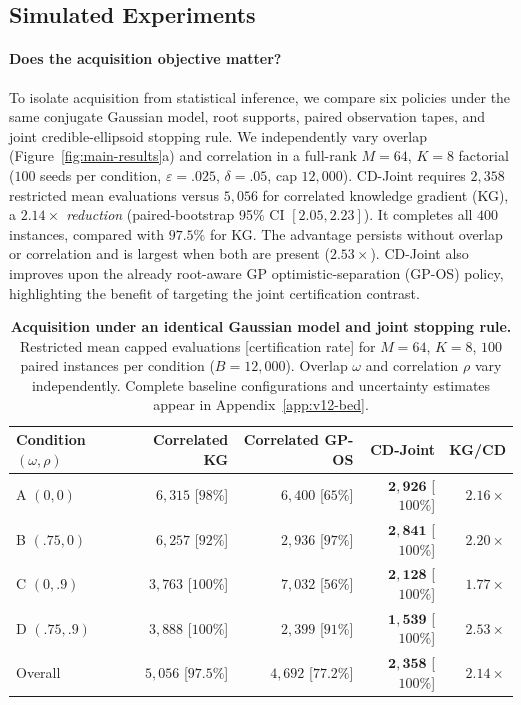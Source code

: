 \documentclass{article}
\theoremstyle{plain}
\theoremstyle{definition}
\begin{document}
\subsection{Simulated Experiments}

\paragraph{Does the acquisition objective matter?}
\label{sec:exp-bed-vs-bo}
To isolate acquisition from statistical inference, we compare six
policies under the same conjugate Gaussian model, root supports,
paired observation tapes, and joint credible-ellipsoid stopping rule.
We independently vary overlap (Figure~\ref{fig:main-results}a) and correlation in a full-rank
$M=64$, $K=8$ factorial ($100$ seeds per condition,
$\varepsilon=.025$, $\delta=.05$, cap $12{,}000$).
CD-Joint requires $2{,}358$ restricted mean evaluations versus
$5{,}056$ for correlated knowledge gradient (KG), a
\emph{$2.14\times$ reduction} (paired-bootstrap 95\% CI $[2.05,2.23]$).
It completes all $400$ instances, compared with $97.5\%$ for KG.
The advantage persists without overlap or correlation and is largest
when both are present ($2.53\times$). CD-Joint also improves upon
the already root-aware GP optimistic-separation (GP-OS) policy,
highlighting the benefit of targeting the joint certification contrast.

\begin{table}[H]
\centering\small
\caption{\textbf{Acquisition under an identical Gaussian model
and joint stopping rule.} Restricted mean capped evaluations
[certification rate] for $M=64$, $K=8$, $100$ paired instances
per condition ($B=12{,}000$). Overlap $\omega$ and correlation
$\rho$ vary independently. Complete baseline configurations and
uncertainty estimates appear in Appendix~\ref{app:v12-bed}.}
\label{tab:main-bed-vs-bo}
\setlength{\tabcolsep}{5pt}
\begin{tabular}{@{}lrrrr@{}}
\toprule
Condition $(\omega,\rho)$ & Correlated KG & Correlated GP-OS & CD-Joint & KG/CD \\
\midrule
A $(0,0)$ & $6{,}315$ [$98\%$] & $6{,}400$ [$65\%$] & $\mathbf{2{,}926}$ [$100\%$] & $2.16\times$ \\
B $(.75,0)$ & $6{,}257$ [$92\%$] & $2{,}936$ [$97\%$] & $\mathbf{2{,}841}$ [$100\%$] & $2.20\times$ \\
C $(0,.9)$ & $3{,}763$ [$100\%$] & $7{,}032$ [$56\%$] & $\mathbf{2{,}128}$ [$100\%$] & $1.77\times$ \\
D $(.75,.9)$ & $3{,}888$ [$100\%$] & $2{,}399$ [$91\%$] & $\mathbf{1{,}539}$ [$100\%$] & $2.53\times$ \\
\midrule
Overall & $5{,}056$ [$97.5\%$] & $4{,}692$ [$77.2\%$] & $\mathbf{2{,}358}$ [$100\%$] & $\mathbf{2.14\times}$ \\
\bottomrule
\end{tabular}
\vspace{-3pt}
\end{table}
\end{document}
